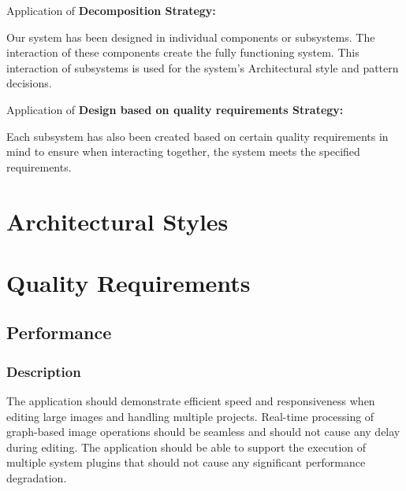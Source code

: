 \documentclass[11pt,a4paper]{article}
\begin{document}
Application of \textbf{Decomposition Strategy:}

Our system has been designed in individual components or subsystems. The
interaction of these components create the fully functioning system. This
interaction of subsystems is used for the system's Architectural style and
pattern decisions.

Application of \textbf{Design based on quality requirements Strategy:}

Each subsystem has also been created based on certain quality requirements in
mind to ensure when interacting together, the system meets the specified
requirements.





\section{Architectural Styles}



\pagebreak

\section{Quality Requirements}

\subsection{Performance}

\subsubsection*{Description}
The application should demonstrate efficient speed and
responsiveness when editing large images and handling multiple projects.
Real-time processing of graph-based image operations should be seamless and
should not cause any delay during editing. The application should be able to
support the execution of multiple system plugins that should not cause any
significant performance degradation.
\end{document}
